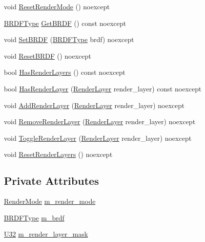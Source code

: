 \begin{DoxyCompactItemize}
\item 
void \hyperlink{structmage_1_1_camera_settings_aa8facc0ddcd3e3d9f3c05c9f44c77b5d}{Reset\+Render\+Mode} () noexcept
\item 
\hyperlink{namespacemage_ae7a7a03a7b34d7e2689689bb8295cd38}{B\+R\+D\+F\+Type} \hyperlink{structmage_1_1_camera_settings_a31504f7e9b23404ee1b200561b8dd789}{Get\+B\+R\+DF} () const noexcept
\item 
void \hyperlink{structmage_1_1_camera_settings_a8fbc3d6013d5f711decaf6f7348f2e15}{Set\+B\+R\+DF} (\hyperlink{namespacemage_ae7a7a03a7b34d7e2689689bb8295cd38}{B\+R\+D\+F\+Type} brdf) noexcept
\item 
void \hyperlink{structmage_1_1_camera_settings_a1f8b3952282d153db4fb6416e9d933b7}{Reset\+B\+R\+DF} () noexcept
\item 
bool \hyperlink{structmage_1_1_camera_settings_a838dfb8f3d32d3d23a7c72719ce182f3}{Has\+Render\+Layers} () const noexcept
\item 
bool \hyperlink{structmage_1_1_camera_settings_a5f5f7e1019db2e65cddc1a62ae30efc7}{Has\+Render\+Layer} (\hyperlink{namespacemage_a8b4a82582105b0299e2c2be5af7255d6}{Render\+Layer} render\+\_\+layer) const noexcept
\item 
void \hyperlink{structmage_1_1_camera_settings_ab1dca8b8f52daf55614592e0bb640ae9}{Add\+Render\+Layer} (\hyperlink{namespacemage_a8b4a82582105b0299e2c2be5af7255d6}{Render\+Layer} render\+\_\+layer) noexcept
\item 
void \hyperlink{structmage_1_1_camera_settings_a358ab9da30af67ca8b1ea2a5eb5a2710}{Remove\+Render\+Layer} (\hyperlink{namespacemage_a8b4a82582105b0299e2c2be5af7255d6}{Render\+Layer} render\+\_\+layer) noexcept
\item 
void \hyperlink{structmage_1_1_camera_settings_a47c34af7eddc2a0f6256d137b5813a4c}{Toggle\+Render\+Layer} (\hyperlink{namespacemage_a8b4a82582105b0299e2c2be5af7255d6}{Render\+Layer} render\+\_\+layer) noexcept
\item 
void \hyperlink{structmage_1_1_camera_settings_afc9bcdb1f27adfb1c69a668a24113b46}{Reset\+Render\+Layers} () noexcept
\end{DoxyCompactItemize}
\subsection*{Private Attributes}
\begin{DoxyCompactItemize}
\item 
\hyperlink{namespacemage_a5e7e18b0154373ce8fc942fe3f6b27fd}{Render\+Mode} \hyperlink{structmage_1_1_camera_settings_aa4d5139b4e8668c58507ead30812c84b}{m\+\_\+render\+\_\+mode}
\item 
\hyperlink{namespacemage_ae7a7a03a7b34d7e2689689bb8295cd38}{B\+R\+D\+F\+Type} \hyperlink{structmage_1_1_camera_settings_ac6a51ea7c770af79de4f97b53cab83b7}{m\+\_\+brdf}
\item 
\hyperlink{namespacemage_a41c104c036fba3756a74e19f793eeaa1}{U32} \hyperlink{structmage_1_1_camera_settings_ad27594c8dc755e0dd8ca55564a4dff8b}{m\+\_\+render\+\_\+layer\+\_\+mask}
\end{DoxyCompactItemize}


